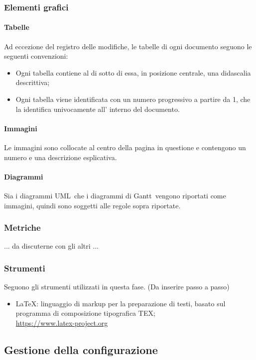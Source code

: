\subsubsection{Elementi grafici}
\paragraph{Tabelle}
Ad eccezione del registro delle modifiche, le tabelle di ogni documento seguono le seguenti convenzioni:
\begin{itemize}
    \item Ogni tabella contiene al di sotto di essa, in posizione centrale, una didascalia descrittiva;
    \item Ogni tabella viene identificata con un numero progressivo a partire da 1, che la identifica univocamente all' interno del documento.
\end{itemize}
\paragraph{Immagini}
Le immagini sono collocate al centro della pagina in questione e contengono un numero e una descrizione esplicativa.
\paragraph{Diagrammi}
Sia i diagrammi UML\glo\ che i diagrammi di Gantt\glo\ vengono riportati come immagini, quindi sono soggetti alle regole sopra riportate.
\subsubsection{Metriche}
... da discuterne con gli altri ...
\subsubsection{Strumenti}
Seguono gli strumenti utilizzati in questa fase. (Da inserire passo a passo)
\begin{itemize}
    \item \LaTeX: linguaggio di markup per la preparazione di testi, basato sul programma di composizione tipografica TEX;\\
         \url{https://www.latex-project.org}
    
\end{itemize}

\pagebreak

\subsection{Gestione della configurazione}\label{subsection:gestione_configurazione}
